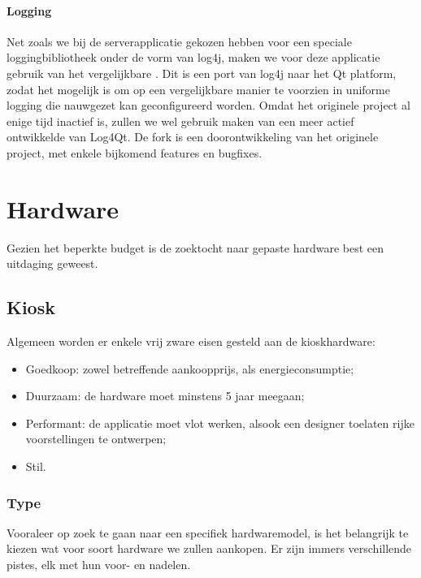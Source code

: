 \subsubsection{Logging}

Net zoals we bij de serverapplicatie gekozen hebben voor een speciale loggingbibliotheek onder de vorm van log4j, maken we voor deze applicatie gebruik van het vergelijkbare . Dit is een port van log4j naar het Qt platform, zodat het mogelijk is om op een vergelijkbare manier te voorzien in uniforme logging die nauwgezet kan geconfigureerd worden. Omdat het originele project al enige tijd inactief is, zullen we wel gebruik maken van een meer actief ontwikkelde  van Log4Qt. De fork is een doorontwikkeling van het originele project, met enkele bijkomend features en bugfixes.


%
%

\chapter{Hardware}
\label{ontwerp:hardware}

Gezien het beperkte budget is de zoektocht naar gepaste hardware best een uitdaging geweest.

\section{Kiosk}
\label{ontwerp:hardware:kiosk}

Algemeen worden er enkele vrij zware eisen gesteld aan de kioskhardware:
\begin{itemize}
\item Goedkoop: zowel betreffende aankoopprijs, als energieconsumptie;
\item Duurzaam: de hardware moet minstens 5 jaar meegaan;
\item Performant: de applicatie moet vlot werken, alsook een designer toelaten rijke voorstellingen te ontwerpen;
\item Stil.
\end{itemize}

\subsection{Type}

Vooraleer op zoek te gaan naar een specifiek hardwaremodel, is het belangrijk te kiezen wat voor soort hardware we zullen aankopen. Er zijn immers verschillende pistes, elk met hun voor- en nadelen.

